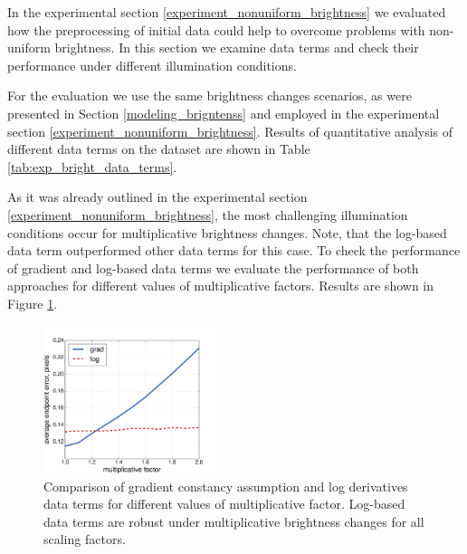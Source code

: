 In the experimental section \ref{experiment_nonuniform_brightness} we evaluated how the preprocessing of initial data could help to overcome problems with non-uniform brightness. In this section we examine data terms and check their performance under different illumination conditions.

For the evaluation we use the same brightness changes scenarios, as were presented in Section \ref{modeling_brigntenss} and employed in the experimental section \ref{experiment_nonuniform_brightness}. Results of quantitative analysis of different data terms on the \rub dataset are shown in Table \ref{tab:exp_bright_data_terms}.

%
%
%
%
 


As it was already outlined in the experimental section \ref{experiment_nonuniform_brightness}, the most challenging illumination conditions occur for multiplicative brightness changes. Note, that the log-based data term outperformed other data terms for this case. To check the performance of gradient and log-based data terms we evaluate the performance of both approaches for different values of multiplicative factors. Results are shown in Figure \ref{fig:exp_bright_mult_factor}.   

 \begin{figure}[ht]
  \centerline{
    \includegraphics[width=0.45\textwidth]{figures/exp_mult_factor.pdf} 
  }  
  \caption{Comparison of gradient constancy assumption and log derivatives data terms for different values of multiplicative factor. Log-based data terms are robust under multiplicative brightness changes for all scaling factors.}
  \label{fig:exp_bright_mult_factor}
\end{figure} 

